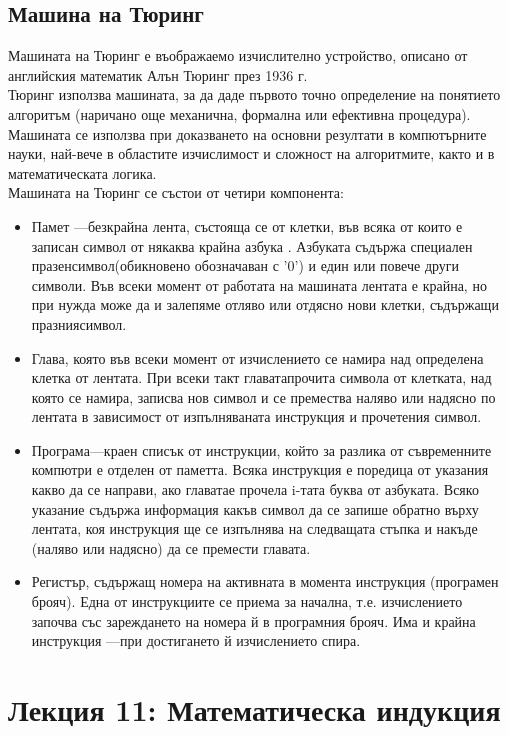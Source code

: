 \documentclass[fleqn, 12pt]{article}
\theoremstyle{definition}
\begin{document}
\subsection{Машина на Тюринг}
Машината на Тюринг е въображаемо изчислително устройство, описано от английския математик Алън Тюринг през 1936 г.\\
Тюринг използва машината, за да даде първото точно определение на понятието алгоритъм (наричано още механична, формална или ефективна процедура). Машината се използва при доказването на основни резултати в компютърните науки, най-вече в областите изчислимост и сложност на алгоритмите, както и в математическата логика.\\
Машината на Тюринг се състои от четири компонента: 
\begin{itemize}
\item Памет —безкрайна лента, състояща се от клетки, във всяка от които е записан символ от някаква крайна азбука  . Азбуката съдържа специален празенсимвол(обикновено обозначаван с '0') и един или повече други символи. Във всеки момент от работата на машината лентата е крайна, но при нужда може да и залепяме отляво или отдясно нови клетки, съдържащи празниясимвол. 
\item Глава, която във всеки момент от изчислението се намира над определена клетка от лентата. При всеки такт главатапрочита символа от клетката, над която се намира, записва нов символ и се премества наляво или надясно по лентата в зависимост от изпълняваната инструкция и прочетения символ. 
\item Програма—краен списък от инструкции, който за разлика от съвременните компютри е отделен от паметта. Всяка инструкция е поредица от указания какво да се направи, ако главатае прочела i-тата буква от азбуката. Всяко указание съдържа информация какъв символ да се запише обратно върху лентата, коя инструкция ще се изпълнява на следващата стъпка и накъде (наляво или надясно) да се премести главата. 
\item Регистър, съдържащ номера на активната в момента инструкция (програмен брояч). Една от инструкциите се приема за начална, т.е. изчислението започва със зареждането на номера й в програмния брояч. Има и крайна инструкция —при достигането й изчислението спира. 
\end{itemize}

\newpage
\section{Лекция 11: Математическа индукция}
\end{document}
